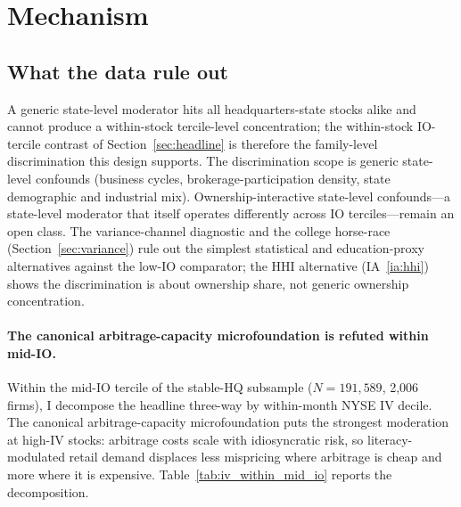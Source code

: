 \section{Mechanism}
\label{sec:mechanism}

\subsection{What the data rule out}
\label{sec:mech-bounds}

A generic state-level moderator hits all headquarters-state stocks alike and cannot produce a within-stock tercile-level concentration; the within-stock IO-tercile contrast of Section~\ref{sec:headline} is therefore the family-level discrimination this design supports. The discrimination scope is generic state-level confounds (business cycles, brokerage-participation density, state demographic and industrial mix). Ownership-interactive state-level confounds---a state-level moderator that itself operates differently across IO terciles---remain an open class. The variance-channel diagnostic and the college horse-race (Section~\ref{sec:variance}) rule out the simplest statistical and education-proxy alternatives against the low-IO comparator; the HHI alternative (IA~\ref{ia:hhi}) shows the discrimination is about ownership share, not generic ownership concentration.

\paragraph{The canonical arbitrage-capacity microfoundation is refuted within mid-IO.} Within the mid-IO tercile of the stable-HQ subsample ($N = 191{,}589$, 2{,}006 firms), I decompose the headline three-way by within-month NYSE IV decile. The canonical arbitrage-capacity microfoundation puts the strongest moderation at high-IV stocks: arbitrage costs scale with idiosyncratic risk, so literacy-modulated retail demand displaces less mispricing where arbitrage is cheap and more where it is expensive. Table~\ref{tab:iv_within_mid_io} reports the decomposition.


